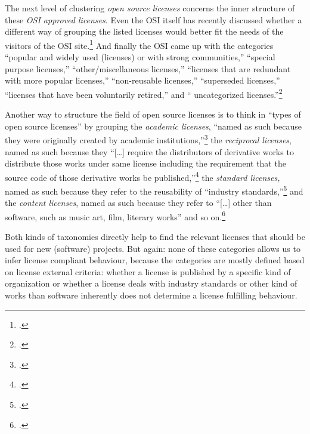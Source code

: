 The next level of clustering \emph{open source licenses} concerns the inner
structure of these \emph{OSI approved licenses}. Even the OSI itself has recently
discussed whether a different way of grouping the listed licenses would better fit
the needs of the visitors of the OSI site.\footcite[cf.][\nopage wp]{OSI2013a}
And finally the OSI came up with the categories \enquote{popular and widely used
(licenses) or with strong communities,} \enquote{special purpose licenses,}
\enquote{other/miscellaneous licenses,} \enquote{licenses that are redundant
with more popular licenses,} \enquote{non-reusable licenses,} \enquote{superseded
licenses,} \enquote{licenses that have been voluntarily retired,} and \enquote{
uncategorized licenses.}\footcite[cf.][\nopage wp]{OSI2013b}

Another way to structure the field of open source licenses is to think in
\enquote{types of open source licenses} by grouping the \emph{academic
licenses}, \enquote{named as such because they were originally created by academic
institutions,}\footcite[cf.][69]{Rosen2005a} the \emph{reciprocal
licenses}, named as such because they \enquote{[\ldots] require the
distributors of derivative works to dis\-tri\-bu\-te those works under same
license including the requirement that the source code of those derivative works
be published,}\footcite[cf.][70]{Rosen2005a} the \emph{standard
licenses,} named as such because they refer to the reusability of
\enquote{industry standards,}\footcite[cf.][70]{Rosen2005a} and the
\emph{content licenses}, named as such because they refer to
\enquote{[\ldots] other than software, such as music art, film, literary works}
and so on.\footcite[cf.][71]{Rosen2005a}

Both kinds of taxonomies directly help to find the relevant licenses that should
be used for new (software) projects. But again: none of these categories 
allows us to infer license compliant behaviour, because the categories are
mostly defined based on license external criteria: whether a license is
published by a specific kind of organization or whether a license deals with
industry standards or other kind of works than software inherently does not
determine a license fulfilling behaviour.

